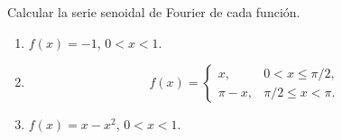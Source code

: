 Calcular la serie senoidal de Fourier de cada función.

\begin{enumerate}[label=(\alph*),ref=\alph*,leftmargin=*]
\item \(f(x)=-1\), \(0<x<1\).
\item \[f(x)=\begin{cases}x,&0<x\le\pi/2,\\\pi-x,&\pi/2\le x<\pi.\end{cases}\]
\item \(f(x)=x-x^2\), \(0<x<1\).
\end{enumerate}
